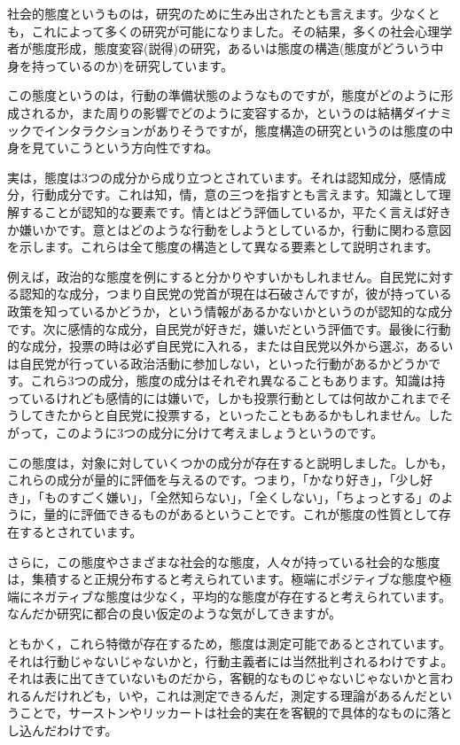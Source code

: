 \documentclass{ltjsbook}
\begin{document}
社会的態度というものは，研究のために生み出されたとも言えます。少なくとも，これによって多くの研究が可能になりました。その結果，多くの社会心理学者が態度形成，態度変容(説得)の研究，あるいは態度の構造(態度がどういう中身を持っているのか)を研究しています。

この態度というのは，行動の準備状態のようなものですが，態度がどのように形成されるか，また周りの影響でどのように変容するか，というのは結構ダイナミックでインタラクションがありそうですが，態度構造の研究というのは態度の中身を見ていこうという方向性ですね。

実は，態度は3つの成分から成り立つとされています。それは認知成分，感情成分，行動成分です。これは知，情，意の三つを指すとも言えます。知識として理解することが認知的な要素です。情とはどう評価しているか，平たく言えば好きか嫌いかです。意とはどのような行動をしようとしているか，行動に関わる意図を示します。これらは全て態度の構造として異なる要素として説明されます。

例えば，政治的な態度を例にすると分かりやすいかもしれません。自民党に対する認知的な成分，つまり自民党の党首が現在は石破さんですが，彼が持っている政策を知っているかどうか，という情報があるかないかというのが認知的な成分です。次に感情的な成分，自民党が好きだ，嫌いだという評価です。最後に行動的な成分，投票の時は必ず自民党に入れる，または自民党以外から選ぶ，あるいは自民党が行っている政治活動に参加しない，といった行動があるかどうかです。これら3つの成分，態度の成分はそれぞれ異なることもあります。知識は持っているけれども感情的には嫌いで，しかも投票行動としては何故かこれまでそうしてきたからと自民党に投票する，といったこともあるかもしれません。したがって，このように3つの成分に分けて考えましょうというのです。

この態度は，対象に対していくつかの成分が存在すると説明しました。しかも，これらの成分が量的に評価を与えるのです。つまり，「かなり好き」，「少し好き」，「ものすごく嫌い」，「全然知らない」，「全くしない」，「ちょっとする」のように，量的に評価できるものがあるということです。これが態度の性質として存在するとされています。

さらに，この態度やさまざまな社会的な態度，人々が持っている社会的な態度は，集積すると正規分布すると考えられています。極端にポジティブな態度や極端にネガティブな態度は少なく，平均的な態度が存在すると考えられています。なんだか研究に都合の良い仮定のような気がしてきますが。

ともかく，これら特徴が存在するため，態度は測定可能であるとされています。それは行動じゃないじゃないかと，行動主義者には当然批判されるわけですよ。それは表に出てきていないものだから，客観的なものじゃないじゃないかと言われるんだけれども，いや，これは測定できるんだ，測定する理論があるんだということで，サーストンやリッカートは社会的実在を客観的で具体的なものに落とし込んだわけです。
\end{document}
